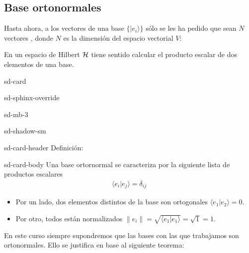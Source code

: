 \documentclass[letterpaper,10pt,english]{jupyterBook}
\newcommand{\ket}[1]{|#1\rangle}
\newcommand{\braket}[2]{\langle #1|#2\rangle}
\newcommand{\Hil}{{\cal H}}
\newcommand{\V}{{ V}}
\begin{document}
\subsection{Base ortonormales}
\label{\detokenize{docs/Part_01_Formalismo/Chapter_01_02_Formalismo_matem_xe1tico/01_02_Vectores_myst:base-ortonormales}}
\sphinxAtStartPar
Hasta ahora, a los vectores de una base \(\{\ket{e_i}\}\) sólo se les ha pedido que sean \(N\) vectores , donde \(N\) es la dimensión del espacio vectorial \(\V\):

\sphinxAtStartPar
En un espacio de Hilbert \(\Hil\) tiene sentido calcular el producto escalar de dos elementos de una base.

\begin{sphinxuseclass}{sd-card}
\begin{sphinxuseclass}{sd-sphinx-override}
\begin{sphinxuseclass}{sd-mb-3}
\begin{sphinxuseclass}{sd-shadow-sm}
\begin{sphinxuseclass}{sd-card-header}
\sphinxAtStartPar
Definición:

\end{sphinxuseclass}
\begin{sphinxuseclass}{sd-card-body}
\sphinxAtStartPar
Una base ortornormal se caracteriza por la siguiente lista de productos escalares
\begin{equation*}
\begin{split}
\braket{e_i}{e_j} = \delta_{ij}
\end{split}
\end{equation*}
\end{sphinxuseclass}
\end{sphinxuseclass}
\end{sphinxuseclass}
\end{sphinxuseclass}
\end{sphinxuseclass}\begin{itemize}
\item {} 
\sphinxAtStartPar
Por un lado, dos elementos distintos de la base son ortogonales \(\braket{e_1}{e_2} = 0\).

\item {} 
\sphinxAtStartPar
Por otro, todos están normalizados  \( \| e_i \| = \sqrt{\braket{e_1}{e_1}} = \sqrt{1} = 1\).

\end{itemize}

\sphinxAtStartPar
En este curso siempre supondremos que las bases con las que trabajamos son ortonormales. Ello se justifica en base al siguiente teorema:
\end{document}
